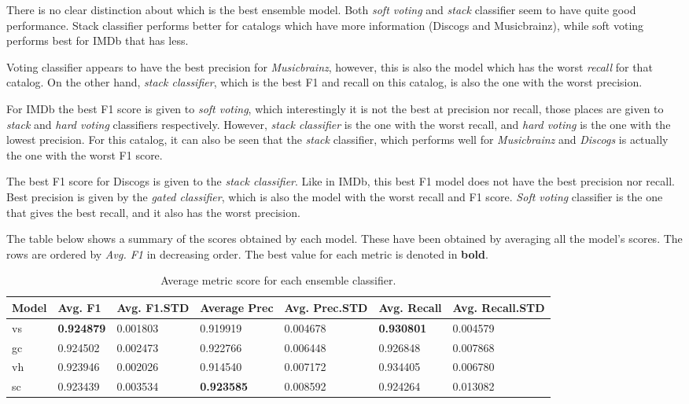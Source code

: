 \documentclass[epsfig,a4paper,11pt,titlepage,twoside,openany]{book}
\begin{document}
There is no clear distinction about which is the best ensemble model. Both \textit{soft voting} and \textit{stack} classifier seem to have quite good performance. Stack classifier performs better for catalogs which have more information (Discogs and Musicbrainz), while soft voting performs best for IMDb that has less. 

Voting classifier appears to have the best precision for \textit{Musicbrainz}, however, this is also the model which has the worst \textit{recall} for that catalog. On the other hand, \textit{stack classifier}, which is the best F1 and recall on this catalog, is also the one with the worst precision. 

For IMDb the best F1 score is given to \textit{soft voting}, which interestingly it is not the best at precision nor recall, those places are given to \textit{stack} and \textit{hard voting} classifiers respectively. However, \textit{stack classifier} is the one with the worst recall, and \textit{hard voting} is the one with the lowest precision. For this catalog, it can also be seen that the \textit{stack} classifier, which performs well for \textit{Musicbrainz} and \textit{Discogs} is actually the one with the worst F1 score.

The best F1 score for Discogs is given to the \textit{stack classifier}. Like in IMDb, this best F1 model does not have the best precision nor recall. Best precision is given by the \textit{gated classifier}, which is also the model with the worst recall and F1 score. \textit{Soft voting} classifier is the one that gives the best recall, and it also has the worst precision.

The table below shows a summary of the scores obtained by each model. These have been obtained by averaging all the model's scores. The rows are ordered by \textit{Avg. F1} in decreasing order. The best value for each metric is denoted in \textbf{bold}.

\begin{table}[H]
\centering
\begin{tabular}{l|l|l|l|l|l|l}
Model & Avg. F1  & Avg. F1.STD & Average Prec & Avg. Prec.STD & Avg. Recall & Avg. Recall.STD \\ \hline
vs    & \textbf{0.924879} & 0.001803    & 0.919919     & 0.004678      & \textbf{0.930801}    & 0.004579        \\
gc    & 0.924502 & 0.002473    & 0.922766     & 0.006448      & 0.926848    & 0.007868        \\
vh    & 0.923946 & 0.002026    & 0.914540     & 0.007172      & 0.934405    & 0.006780        \\
sc    & 0.923439 & 0.003534    & \textbf{0.923585}     & 0.008592      & 0.924264    & 0.013082          
\end{tabular}
\caption{Average metric score for each ensemble classifier.}
\label{tab:metrics-summary-for-ensembles}
\end{table}
\end{document}
